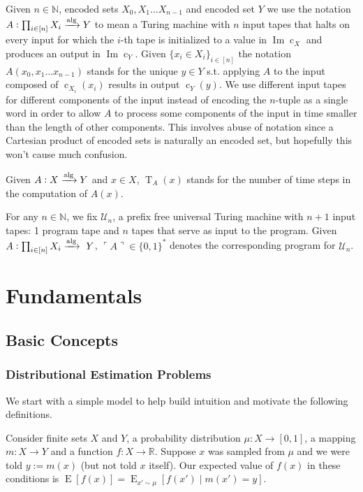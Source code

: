 \documentclass{article}
\numberwithin{equation}{section}
\theoremstyle{definition}
\theoremstyle{plain}
\newcommand{\Bool}{\{0,1\}}
\newcommand{\Words}{{\Bool^*}}
\DeclareMathOperator{\Img}{Im}
\DeclareMathOperator{\E}{E}
\DeclareMathOperator{\T}{T}
\DeclareMathOperator{\En}{c}
\newcommand{\Nats}{\mathbb{N}}
\newcommand{\Reals}{\mathbb{R}}
\newcommand{\Quote}[1]{\ulcorner #1 \urcorner}
\newcommand{\Alg}{\xrightarrow{\textnormal{alg}}}
\begin{document}
Given $n \in \Nats$, encoded sets $X_0, X_1 \ldots X_{n-1}$ and encoded set $Y$ we use the notation $A: \prod_{i \in [n]} X_i \Alg Y$ to mean a Turing machine with $n$ input tapes that halts on every input for which the $i$-th tape is initialized to a value in $\Img \En_X$ and produces an output in $\Img \En_Y$. Given $\{x_i \in X_i\}_{i \in [n]}$ the notation $A(x_0, x_1 \ldots x_{n-1})$ stands for the unique $y \in Y$ s.t. applying $A$ to the input composed of $\En_{X_i}(x_i)$ results in output $\En_Y(y)$. We use different input tapes for different components of the input instead of encoding the $n$-tuple as a single word in order to allow $A$ to process some components of the input in time smaller than the length of other components. This involves abuse of notation since a Cartesian product of encoded sets is naturally an encoded set, but hopefully this won't cause much confusion.

Given $A: X \Alg Y$ and $x \in X$, $\T_A(x)$ stands for the number of time steps in the computation of $A(x)$.

For any $n \in \Nats$, we fix $\mathcal{U}_n$, a prefix free universal Turing machine with $n+1$ input tapes: 1 program tape and $n$ tapes that serve as input to the program. Given $A: \prod_{i \in [n]} X_i \Alg\ Y$, $\Quote{A} \in \Words$ denotes the corresponding program for $\mathcal{U}_n$.

\section{Fundamentals}
\label{sec:fundamentals}

\subsection{Basic Concepts}

\subsubsection{Distributional Estimation Problems}

We start with a simple model to help build intuition and motivate the following definitions.

Consider finite sets $X$ and $Y$, a probability distribution $\mu: X \rightarrow [0,1]$, a mapping $m: X \rightarrow Y$ and a function $f: X \rightarrow \Reals$. Suppose $x$ was sampled from $\mu$ and we were told $y := m(x)$ (but not told $x$ itself). Our expected value of $f(x)$ in these conditions is $\E[f(x)] = \E_{x' \sim \mu}[f(x') \mid m(x') = y]$.
\end{document}
